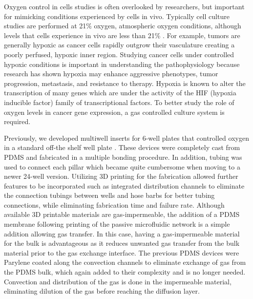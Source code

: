 \documentclass[10pt,letterpaper]{article}
\begin{document}
Oxygen control in cells studies is often overlooked by researchers, but important for mimicking conditions experienced by cells in vivo.
Typically cell culture studies are performed at 21\% oxygen, atmospheric oxygen conditions, although levels that cells experience in vivo are less than 21\% \cite{Brennan2014}.
For example, tumors are generally hypoxic as cancer cells rapidly outgrow their vasculature creating a poorly perfused, hypoxic inner region\cite{Kumar2014}.
Studying cancer cells under controlled hypoxic conditions is important in understanding the pathophysiology because research has shown hypoxia may enhance aggressive phenotypes, tumor progression, metastasis, and resistance to therapy\cite{Vaupel2004,Vaupel2007,Gilkes2014}.
Hypoxia is known to alter the transcription of many genes which are under the activity of the HIF (hypoxia inducible factor) family of transcriptional factors\cite{Ke2006,Semenza1999,Semenza2002}.
To better study the role of oxygen levels in cancer gene expression, a gas controlled culture system is required.

Previously, we developed multiwell inserts for 6-well plates that controlled oxygen in a standard off-the shelf well plate \cite{Oppegard2009, Oppegard2010}.
These devices were completely cast from PDMS and fabricated in a multiple bonding procedure.
In addition, tubing was used to connect each pillar which became quite cumbersome when moving to a newer 24-well version.
Utilizing 3D printing for the fabrication allowed further features to be incorporated such as integrated distribution channels to eliminate the connection tubings between wells and hose barbs for better tubing connections, while eliminating fabrication time and failure rate.
Although available 3D printable materials are gas-impermeable, the addition of a PDMS membrane following printing of the passive microfluidic network is a simple addition allowing gas transfer. 
In this case, having a gas-impermeable material for the bulk is advantageous as it reduces unwanted gas transfer from the bulk material prior to the gas exchange interface.
The previous PDMS devices were Parylene coated along the convection channels to eliminate exchange of gas from the PDMS bulk, which again added to their complexity and is no longer needed.
Convection and distribution of the gas is done in the impermeable material, eliminating dilution of the gas before reaching the diffusion layer. 

\end{document}
